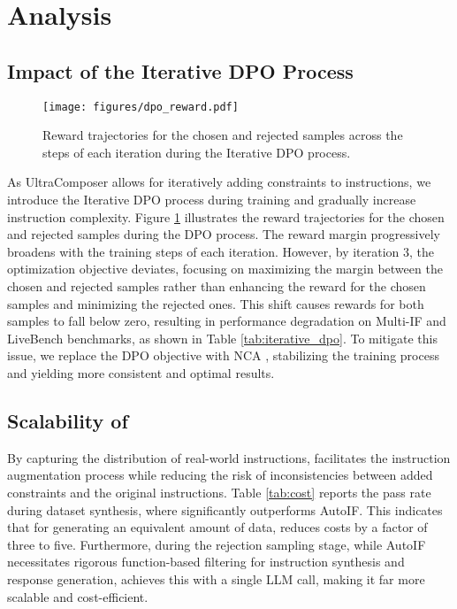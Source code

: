 
\section{Analysis}
\subsection{Impact of the Iterative DPO Process}

\begin{figure}[h]
    \centering
    \texttt{[image: figures/dpo\_reward.pdf]}
    \caption{Reward trajectories for the chosen and rejected samples across the steps of each iteration during the Iterative DPO process.}
    \label{fig:dpo_loss}
\end{figure}

As UltraComposer allows for iteratively adding constraints to instructions, we introduce the Iterative DPO process during training and gradually increase instruction complexity. Figure \ref{fig:dpo_loss} illustrates the reward trajectories for the chosen and rejected samples during the DPO process. The reward margin progressively broadens with the training steps of each iteration. However, by iteration 3, the optimization objective deviates, focusing on maximizing the margin between the chosen and rejected samples rather than enhancing the reward for the chosen samples and minimizing the rejected ones. This shift causes rewards for both samples to fall below zero, resulting in performance degradation on Multi-IF and LiveBench benchmarks, as shown in Table \ref{tab:iterative_dpo}.  To mitigate this issue, we replace the DPO objective with NCA \citep{chen2024noise},  stabilizing the training process and yielding more consistent and optimal results.



\subsection{Scalability of \method}
By capturing the distribution of real-world instructions, \method facilitates the instruction augmentation process while reducing the risk of inconsistencies between added constraints and the original instructions. Table \ref{tab:cost} reports the pass rate during dataset synthesis, where \method significantly outperforms AutoIF. This indicates that for generating an equivalent amount of data, \method reduces costs by a factor of three to five. Furthermore, during the rejection sampling stage, while AutoIF necessitates rigorous function-based filtering for instruction synthesis and response generation, \method achieves this with a single LLM call, making it far more scalable and cost-efficient.

